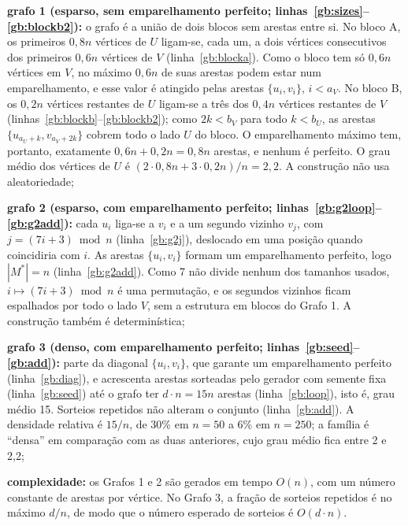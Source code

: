 \begin{alineas}
    \item \textbf{grafo 1 (esparso, sem emparelhamento perfeito; linhas~\ref{gb:sizes}--\ref{gb:blockb2}):} o grafo é a união de dois blocos sem arestas entre si. No bloco A, os primeiros $0{,}8n$ vértices de $U$ ligam-se, cada um, a dois vértices consecutivos dos primeiros $0{,}6n$ vértices de $V$ (linha~\ref{gb:blocka}). Como o bloco tem só $0{,}6n$ vértices em $V$, no máximo $0{,}6n$ de suas arestas podem estar num emparelhamento, e esse valor é atingido pelas arestas $\{u_i, v_i\}$, $i < a_V$. No bloco B, os $0{,}2n$ vértices restantes de $U$ ligam-se a três dos $0{,}4n$ vértices restantes de $V$ (linhas~\ref{gb:blockb}--\ref{gb:blockb2}); como $2k < b_V$ para todo $k < b_U$, as arestas $\{u_{a_U+k}, v_{a_V+2k}\}$ cobrem todo o lado $U$ do bloco. O emparelhamento máximo tem, portanto, exatamente $0{,}6n + 0{,}2n = 0{,}8n$ arestas, e nenhum é perfeito. O grau médio dos vértices de $U$ é $(2 \cdot 0{,}8n + 3 \cdot 0{,}2n)/n = 2{,}2$. A construção não usa aleatoriedade;
    \item \textbf{grafo 2 (esparso, com emparelhamento perfeito; linhas~\ref{gb:g2loop}--\ref{gb:g2add}):} cada $u_i$ liga-se a $v_i$ e a um segundo vizinho $v_j$, com $j = (7i + 3) \bmod n$ (linha~\ref{gb:g2j}), deslocado em uma posição quando coincidiria com $i$. As arestas $\{u_i, v_i\}$ formam um emparelhamento perfeito, logo $|M^*| = n$ (linha~\ref{gb:g2add}). Como 7 não divide nenhum dos tamanhos usados, $i \mapsto (7i+3) \bmod n$ é uma permutação, e os segundos vizinhos ficam espalhados por todo o lado $V$, sem a estrutura em blocos do Grafo 1. A construção também é determinística;
    \item \textbf{grafo 3 (denso, com emparelhamento perfeito; linhas~\ref{gb:seed}--\ref{gb:add}):} parte da diagonal $\{u_i, v_i\}$, que garante um emparelhamento perfeito (linha~\ref{gb:diag}), e acrescenta arestas sorteadas pelo gerador com semente fixa (linha~\ref{gb:seed}) até o grafo ter $d \cdot n = 15n$ arestas (linha~\ref{gb:loop}), isto é, grau médio 15. Sorteios repetidos não alteram o conjunto (linha~\ref{gb:add}). A densidade relativa é $15/n$, de 30\% em $n = 50$ a 6\% em $n = 250$; a família é ``densa'' em comparação com as duas anteriores, cujo grau médio fica entre 2 e 2,2;
    \item \textbf{complexidade:} os Grafos 1 e 2 são gerados em tempo $O(n)$, com um número constante de arestas por vértice. No Grafo 3, a fração de sorteios repetidos é no máximo $d/n$, de modo que o número esperado de sorteios é $O(d \cdot n)$.
\end{alineas}

